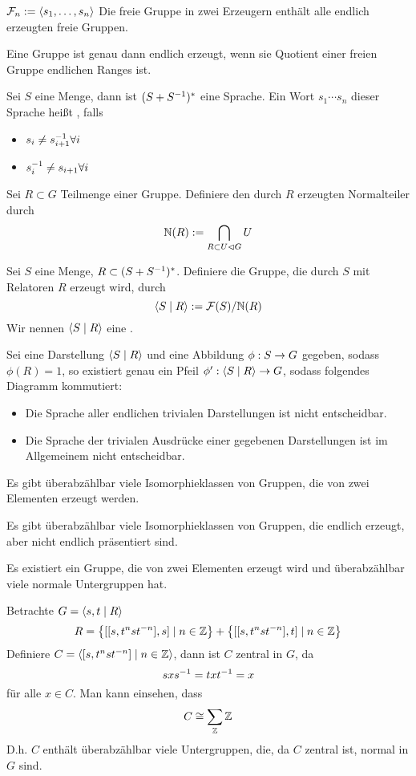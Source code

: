 \documentclass{article}
\newcommand{\normal}{\vartriangleleft}
\newcommand{\tm}{\subset}
\begin{document}
$\F_n := \grp{s_1, \ldots, s_n}{}$
Die freie Gruppe in zwei Erzeugern enthält alle endlich erzeugten freie Gruppen.

\Satz{}
Eine Gruppe ist genau dann endlich erzeugt, wenn sie Quotient einer freien Gruppe endlichen Ranges ist.

Sei $S$ eine Menge, dann ist $(S + S^{-1})^*$ eine Sprache. Ein Wort $s_1\cdots s_n$ dieser Sprache heißt , falls
\begin{itemize}
\item $s_i \neq s_{i+1}^{-1} \forall i$
\item $s_i^{-1} \neq s_{i+1} \forall i$
\end{itemize}

Sei $R \tm G$ Teilmenge einer Gruppe. Definiere den durch $R$ erzeugten Normalteiler durch
\[\N(R) := \bigcap_{R \tm U \normal G} U \] 

Sei $S$ eine Menge, $R \subset (S + S^{-1})^*$. Definiere die Gruppe, die durch $S$ mit Relatoren $R$ erzeugt wird, durch
\[ \grp{S}{R} := \F(S) / \N(R) \]
Wir nennen $\grp{S}{R}$ eine .

Sei eine Darstellung $\grp{S}{R}$ und eine Abbildung $\phi : S \overset{}{\rightarrow} G$ gegeben, sodass $\phi(R) = 1$, so existiert genau ein Pfeil $\phi' :\grp{S}{R} \pfeil{} G$, sodass folgendes Diagramm kommutiert:
\begin{center}
\end{center}

\Bsp{}

\Bem{}
\begin{itemize}
\item Die Sprache aller endlichen trivialen Darstellungen ist nicht entscheidbar.
\item Die Sprache der trivialen Ausdrücke einer gegebenen Darstellungen ist im Allgemeinem nicht entscheidbar.
\end{itemize}

\Satz{}
Es gibt überabzählbar viele Isomorphieklassen von Gruppen, die von zwei Elementen erzeugt werden.

\Kor{}
Es gibt überabzählbar viele Isomorphieklassen von Gruppen, die endlich erzeugt, aber nicht endlich präsentiert sind.

\Prop{}
Es existiert ein Gruppe, die von zwei Elementen erzeugt wird und überabzählbar viele normale Untergruppen hat.
\begin{Beweis}{}
Betrachte $G = \grp{s,t}{R}$
\[ R = \set{[[s, t^nst^{-n}],s]}{n\in \Z} + \set{[[s, t^nst^{-n}],t]}{n\in \Z} \]
Definiere $C = \grp{[s, t^nst^{-n}]}{n \in \Z}$, dann ist $C$ zentral in $G$, da
\[sxs^{-1} = txt^{-1} = x \]
für alle $x \in C$. Man kann einsehen, dass
\[ C \overset{}{\cong} \sum_{\mathbb{Z}}\mathbb{Z} \]
D.h. $C$ enthält überabzählbar viele Untergruppen, die, da $C$ zentral ist, normal in $G$ sind.
\end{Beweis}
\end{document}
